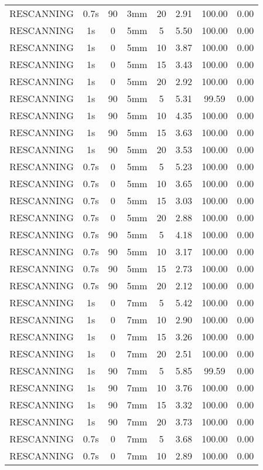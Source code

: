 \begin{table}[H]
\begin{tabular}{|c||c|c|c|c||c|c|c|}
RESCANNING & 0.7s & 90 & 3mm & 20 & 2.91 & 100.00 & 0.00 \\
RESCANNING & 1s & 0 & 5mm & 5 & 5.50 & 100.00 & 0.00 \\
RESCANNING & 1s & 0 & 5mm & 10 & 3.87 & 100.00 & 0.00 \\
RESCANNING & 1s & 0 & 5mm & 15 & 3.43 & 100.00 & 0.00 \\
RESCANNING & 1s & 0 & 5mm & 20 & 2.92 & 100.00 & 0.00 \\
RESCANNING & 1s & 90 & 5mm & 5 & 5.31 & 99.59 & 0.00 \\
RESCANNING & 1s & 90 & 5mm & 10 & 4.35 & 100.00 & 0.00 \\
RESCANNING & 1s & 90 & 5mm & 15 & 3.63 & 100.00 & 0.00 \\
RESCANNING & 1s & 90 & 5mm & 20 & 3.53 & 100.00 & 0.00 \\
RESCANNING & 0.7s & 0 & 5mm & 5 & 5.23 & 100.00 & 0.00 \\
RESCANNING & 0.7s & 0 & 5mm & 10 & 3.65 & 100.00 & 0.00 \\
RESCANNING & 0.7s & 0 & 5mm & 15 & 3.03 & 100.00 & 0.00 \\
RESCANNING & 0.7s & 0 & 5mm & 20 & 2.88 & 100.00 & 0.00 \\
RESCANNING & 0.7s & 90 & 5mm & 5 & 4.18 & 100.00 & 0.00 \\
RESCANNING & 0.7s & 90 & 5mm & 10 & 3.17 & 100.00 & 0.00 \\
RESCANNING & 0.7s & 90 & 5mm & 15 & 2.73 & 100.00 & 0.00 \\
RESCANNING & 0.7s & 90 & 5mm & 20 & 2.12 & 100.00 & 0.00 \\
RESCANNING & 1s & 0 & 7mm & 5 & 5.42 & 100.00 & 0.00 \\
RESCANNING & 1s & 0 & 7mm & 10 & 2.90 & 100.00 & 0.00 \\
RESCANNING & 1s & 0 & 7mm & 15 & 3.26 & 100.00 & 0.00 \\
RESCANNING & 1s & 0 & 7mm & 20 & 2.51 & 100.00 & 0.00 \\
RESCANNING & 1s & 90 & 7mm & 5 & 5.85 & 99.59 & 0.00 \\
RESCANNING & 1s & 90 & 7mm & 10 & 3.76 & 100.00 & 0.00 \\
RESCANNING & 1s & 90 & 7mm & 15 & 3.32 & 100.00 & 0.00 \\
RESCANNING & 1s & 90 & 7mm & 20 & 3.73 & 100.00 & 0.00 \\
RESCANNING & 0.7s & 0 & 7mm & 5 & 3.68 & 100.00 & 0.00 \\
RESCANNING & 0.7s & 0 & 7mm & 10 & 2.89 & 100.00 & 0.00 \\

\end{tabular}
\end{table}

